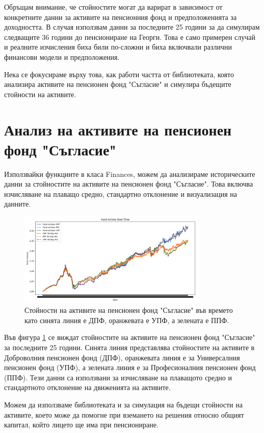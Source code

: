 \documentclass[a4paper,12pt]{article}
\begin{document}
Обръщам внимание, че стойностите могат да варират в зависимост от конкретните данни за активите на пенсионния фонд и предположенията за доходността. В случая използвам данни за последните 25 години за да симулирам следващите 36 години до пенсиониране на Георги. Това е само примерен случай и реалните изчисления биха били по-сложни и биха включвали различни финансови модели и предположения.

Нека се фокусираме върху това, как работи частта от библиотеката, която анализира активите на пенсионен фонд "Съгласие" и симулира бъдещите стойности на активите.

\section{Анализ на активите на пенсионен фонд "Съгласие"}
Използвайки функциите в класа Finances, можем да анализираме историческите данни за стойностите на активите на пенсионен фонд "Съгласие". Това включва изчисляване на плаващо средно, стандартно отклонение и визуализация на данните.
\begin{figure}[ht]
        \centering
        \includegraphics[width=0.8\textwidth]{images/asset_values.png}
        \caption{Стойности на активите на пенсионен фонд "Съгласие" във времето като синята линия е ДПФ, оранжевата е УПФ, а зелената е ППФ.}
        \label{fig:asset_values}
\end{figure}
Във фигура \ref{fig:asset_values} се виждат стойностите на активите на пенсионен фонд "Съгласие" за последните 25 години. Синята линия представлява стойностите на активите в Доброволния пенсионен фонд (ДПФ), оранжевата линия е за Универсалния пенсионен фонд (УПФ), а зелената линия е за Професионалния пенсионен фонд (ППФ). Тези данни са използвани за изчисляване на плаващото средно и стандартното отклонение на движенията на активите.

Можем да използваме библиотеката и за симулация на бъдещи стойности на активите, което може да помогне при вземането на решения относно общият капитал, който лицето ще има при пенсиониране.
\end{document}
